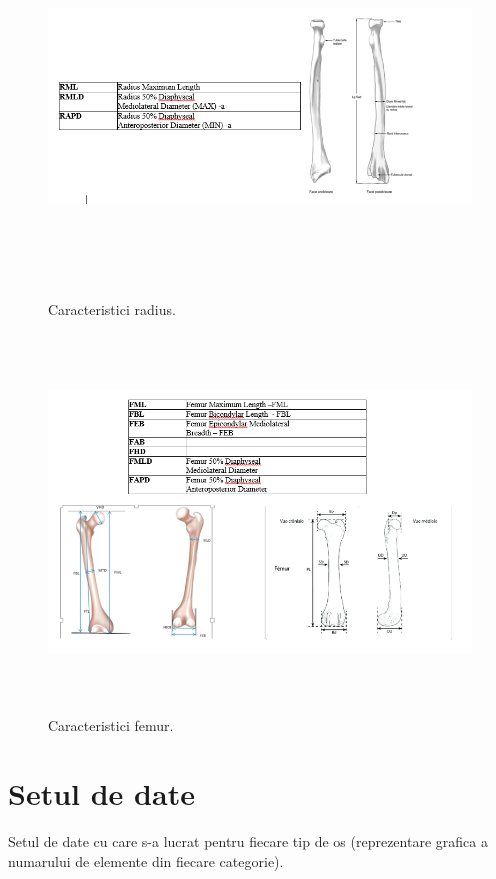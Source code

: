 \documentclass[runningheads,a4paper,11pt]{report}
\begin{document}
\begin{figure}[h!]
\centerline{\includegraphics[height=10cm]{Imagini/radius.PNG}}
\caption{Caracteristici radius.}
\label{fig}
\end{figure}

\begin{figure}[h!]
\centerline{\includegraphics[height=10cm]{Imagini/femur.PNG}}
\caption{Caracteristici femur.}
\label{fig}
\end{figure}

\section{Setul de date}
\label{section:date}
Setul de date cu care s-a lucrat pentru fiecare tip de os (reprezentare grafica a numarului de elemente din fiecare categorie).
\end{document}
